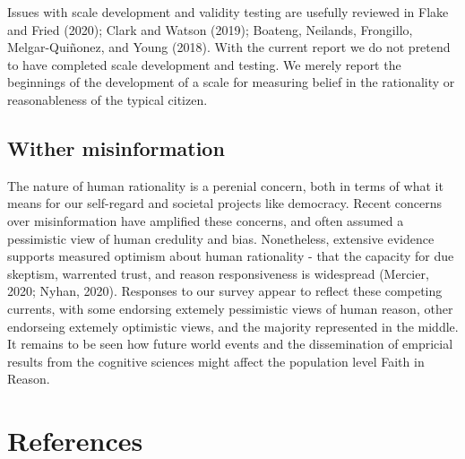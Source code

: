 \documentclass[
  ,jou,floatsintext]{apa6}
\begin{document}
Issues with scale development and validity testing are usefully reviewed in Flake and Fried (2020); Clark and Watson (2019); Boateng, Neilands, Frongillo, Melgar-Quiñonez, and Young (2018). With the current report we do not pretend to have completed scale development and testing. We merely report the beginnings of the development of a scale for measuring belief in the rationality or reasonableness of the typical citizen.

\hypertarget{wither-misinformation}{%
\subsection{Wither misinformation}\label{wither-misinformation}}

The nature of human rationality is a perenial concern, both in terms of what it means for our self-regard and societal projects like democracy. Recent concerns over misinformation have amplified these concerns, and often assumed a pessimistic view of human credulity and bias. Nonetheless, extensive evidence supports measured optimism about human rationality - that the capacity for due skeptism, warrented trust, and reason responsiveness is widespread (Mercier, 2020; Nyhan, 2020). Responses to our survey appear to reflect these competing currents, with some endorsing extemely pessimistic views of human reason, other endorseing extemely optimistic views, and the majority represented in the middle. It remains to be seen how future world events and the dissemination of empricial results from the cognitive sciences might affect the population level Faith in Reason.

\hypertarget{references}{%
\section*{References}\label{references}}
\end{document}
